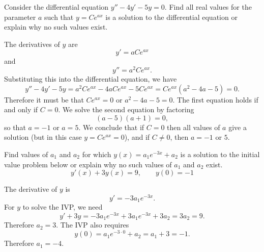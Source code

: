 \documentclass[noauthor, handout]{ximera}
\begin{document}
\begin{problem} 
Consider the differential equation $y''-4y'-5y = 0$.  Find all real values for the parameter $a$ such that $y=Ce^{ax}$ is a solution to the differential equation or explain why no such values exist.

\begin{freeResponse}
The derivatives of $y$ are 
$$
y' = aC e^{ax}
$$
and 
$$
y'' = a^2 C e^{ax}.
$$
Substituting this into the differential equation, we have
$$
y'' - 4y' -5y = a^2 C e^{ax} - 4 aC e^{ax} - 5Ce^{ax} = C e^{ax}\left(a^2 - 4a - 5\right) = 0.
$$
Therefore it must be that $C e^{ax} = 0$ or $a^2 - 4a - 5 = 0$. The first equation holds if and only if $C = 0$. We solve the second equation by factoring
$$
(a-5)(a+1) = 0,
$$ 
so that $a=-1$ or $a=5$. We conclude that if $C=0$ then all values of $a$ give a solution (but in this case $y=Ce^{ax} = 0$), and if $C \neq 0$, then $a=-1$ or $5$. 
\end{freeResponse}
\end{problem}


\begin{problem} 
Find values of $a_1$ and $a_2$ for which $y(x) = a _1 e^{-3x}+a_2$ is a solution to the initial value problem below or explain why no such values of $a_1$ and $a_2$ exist.  $$y'(x) +3y(x) = 9  , \qquad y(0) = -1 $$

\begin{freeResponse}
The derivative of $y$ is 
$$
y' = -3 a_1 e^{-3x}.
$$
For $y$ to solve the IVP, we need
$$
y' + 3y = -3a_1 e^{-3x} + 3a_1 e^{-3x} + 3 a_2 = 3 a_2 = 9.
$$
Therefore $a_2 = 3$. The IVP also requires 
$$
y(0) = a_1 e^{-3 \cdot 0} + a_2 = a_1 + 3 = -1.
$$
Therefore $a_1 = -4$. 
\end{freeResponse}
\end{problem}
\end{document}
